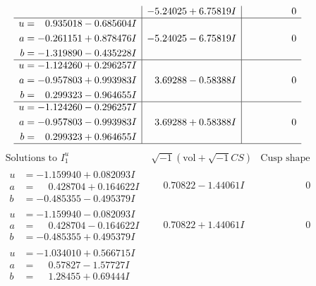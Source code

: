 \documentclass[1p]{elsarticle_modified}
\theoremstyle{definition}
\newcommand{\I}{\sqrt{-1}}
\begin{document}
$$\begin{array}{c|c|c}
 & -5.24025 + 6.75819 I & \phantom{-0.000000 } 0 \\ \hline\begin{aligned}
u &= \phantom{-}0.935018 - 0.685604 I \\
a &= -0.261151 + 0.878476 I \\
b &= -1.319890 - 0.435228 I\end{aligned}
 & -5.24025 - 6.75819 I & \phantom{-0.000000 } 0 \\ \hline\begin{aligned}
u &= -1.124260 + 0.296257 I \\
a &= -0.957803 + 0.993983 I \\
b &= \phantom{-}0.299323 - 0.964655 I\end{aligned}
 & \phantom{-}3.69288 - 0.58388 I & \phantom{-0.000000 } 0 \\ \hline\begin{aligned}
u &= -1.124260 - 0.296257 I \\
a &= -0.957803 - 0.993983 I \\
b &= \phantom{-}0.299323 + 0.964655 I\end{aligned}
 & \phantom{-}3.69288 + 0.58388 I & \phantom{-0.000000 } 0\\
 \hline 
 \end{array}$$\newpage$$\begin{array}{c|c|c}  
\text{Solutions to }I^u_{1}& \I (\text{vol} + \sqrt{-1}CS) & \text{Cusp shape}\\
 \hline 
\begin{aligned}
u &= -1.159940 + 0.082093 I \\
a &= \phantom{-}0.428704 + 0.164622 I \\
b &= -0.485355 - 0.495379 I\end{aligned}
 & \phantom{-}0.70822 - 1.44061 I & \phantom{-0.000000 } 0 \\ \hline\begin{aligned}
u &= -1.159940 - 0.082093 I \\
a &= \phantom{-}0.428704 - 0.164622 I \\
b &= -0.485355 + 0.495379 I\end{aligned}
 & \phantom{-}0.70822 + 1.44061 I & \phantom{-0.000000 } 0 \\ \hline\begin{aligned}
u &= -1.034010 + 0.566715 I \\
a &= \phantom{-}0.57827 - 1.57727 I \\
b &= \phantom{-}1.28455 + 0.69444 I\end{aligned}

\end{array}$$
\end{document}
